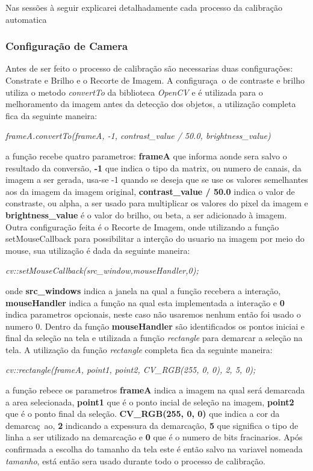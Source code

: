 		Nas sessões à seguir explicarei detalhadamente cada processo da calibração automatica
	\subsubsection{Configuração de Camera}
Antes de ser feito o processo de calibração são necessarias duas configurações: Constrate e Brilho e o Recorte de Imagem.
A configuraça~o de contraste e brilho utiliza o metodo \textit{convertTo} da biblioteca \textit{OpenCV} e é utilizada para o melhoramento da imagem antes da detecção dos objetos, a utilização completa fica da seguinte maneira:
\begin{center}
\centering \textit{ frameA.convertTo(frameA, -1, contrast\_value / 50.0, brightness\_value)}
\end{center}
a função recebe quatro parametros: \textbf{frameA} que informa aonde sera salvo o resultado da conversão, \textbf{-1} que indica o tipo da matrix, ou numero de canais, da imagem a ser gerada, usa-se -1 quando se deseja que se use os valores semelhantes aos da imagem da imagem original\cite{OpenCV}, \textbf{contrast\_value / 50.0} indica o valor de constraste, ou alpha, a ser usado para multiplicar os valores do pixel da imagem\cite{OpenCV} e \textbf{brightness\_value} é o valor do brilho, ou beta, a ser adicionado à imagem. \newline
Outra configuração feita é o Recorte de Imagem, onde utilizando a função setMouseCallback para possibilitar a interção do usuario na imagem por meio do mouse, sua utilização é dada da seguinte maneira:
\begin{center}
\centering \textit{ cv::setMouseCallback(src\_window,mouseHandler,0);}
\end{center}
onde \textbf{src\_windows} indica a janela na qual a função recebera a interação,  \textbf{mouseHandler} indica a função na qual esta implementada a interação e \textbf{0} indica parametros opcionais, neste caso não usaremos nenhum então foi usado o numero 0.
Dentro da função \textbf{mouseHandler} são identificados os pontos iniciai e final da seleção na tela e utilizada a função \textit{rectangle} para demarcar a seleção na tela. A utilização da função \textit{rectangle} completa fica da seguinte maneira:
\begin{center}
\centering \textit{ cv::rectangle(frameA, point1, point2, CV\_RGB(255, 0, 0), 2, 5, 0);}
\end{center}
a função rebece os parametros \textbf{frameA} indica a imagem na qual será demarcada a area selecionada, \textbf{point1} que é o ponto incial de seleção na imagem, \textbf{point2} que é o ponto final da seleção. \textbf{CV\_RGB(255, 0, 0)} que indica a cor da demarcaç~ao, \textbf{2} indicando a expessura da demarcação, \textbf{5} que significa o tipo de linha a ser utilizado na demarcação e \textbf{0} que é o numero de bits fracinarios.
 Após confirmada a escolha do tamanho da tela 
este é então salvo na variavel nomeada \textit{tamanho}, está então sera usado durante todo o processo de calibração.
\newpage
